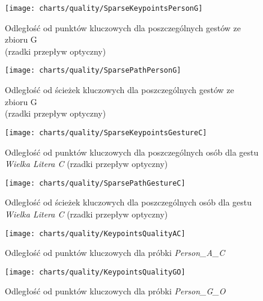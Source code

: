    \newpage
    \begin{figure}[!ht]
      \centering
      \texttt{[image: charts/quality/SparseKeypointsPersonG]}
      \caption[Odległość od punktów kluczowych dla poszczególnych gestów]
              {Odległość od punktów kluczowych dla poszczególnych gestów ze zbioru G\\(rzadki przepływ optyczny)}
      \label{fig:SparseKeypointsPersonG}
    \end{figure}

    \begin{figure}[!ht]
      \centering
      \texttt{[image: charts/quality/SparsePathPersonG]}
      \caption[Odległość od ścieżek kluczowych dla poszczególnych gestów]
              {Odległość od ścieżek kluczowych dla poszczególnych gestów ze zbioru G\\(rzadki przepływ optyczny)}
      \label{fig:SparsePathPersonG}
    \end{figure}

    \newpage
    \begin{figure}[!ht]
      \centering
      \texttt{[image: charts/quality/SparseKeypointsGestureC]}
      \caption[Odległość od punktów kluczowych dla poszczególnych osób dla gestu C]
              {Odległość od punktów kluczowych dla poszczególnych osób dla gestu\\\textit{Wielka Litera C} (rzadki przepływ optyczny)}
      \label{fig:SparseKeypointsGestureC}
    \end{figure}

    \begin{figure}[!ht]
      \centering
      \texttt{[image: charts/quality/SparsePathGestureC]}
      \caption[Odległość od ścieżek kluczowych dla poszczególnych osób dla gestu C]
              {Odległość od ścieżek kluczowych dla poszczególnych osób dla gestu\\\textit{Wielka Litera C} (rzadki przepływ optyczny)}
      \label{fig:SparsePathGestureC}
    \end{figure}

    \newpage
    \begin{figure}[!ht]
      \centering
      \texttt{[image: charts/quality/KeypointsQualityAC]}
      \caption[Odległość od punktów kluczowych]
              {Odległość od punktów kluczowych dla próbki \textit{Person\_A\_C}}
      \label{fig:KeypointsQualityAC}
    \end{figure}

    \begin{figure}[!ht]
      \centering
      \texttt{[image: charts/quality/KeypointsQualityGO]}
      \caption[Odległość od punktów kluczowych]
              {Odległość od punktów kluczowych dla próbki \textit{Person\_G\_O}}
      \label{fig:KeypointsQualityGO}
    \end{figure}


